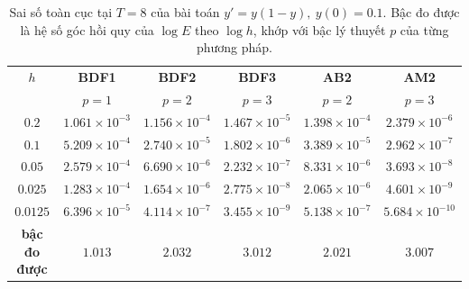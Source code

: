 \begin{table}[H]
\centering
\caption{Sai số toàn cục tại $T=8$ của bài toán $y'=y(1-y),\ y(0)=0.1$. Bậc đo được là hệ số góc hồi quy của $\log E$ theo $\log h$, khớp với bậc lý thuyết $p$ của từng phương pháp.}
\label{tab:convergence}
\renewcommand{\arraystretch}{1.2}
\begin{tabular}{cccccc}
\toprule
$h$ & \textbf{BDF1} & \textbf{BDF2} & \textbf{BDF3} & \textbf{AB2} & \textbf{AM2}\\
 & $p=1$ & $p=2$ & $p=3$ & $p=2$ & $p=3$\\
\midrule
$0.2$ & $1.061\times 10^{-3}$ & $1.156\times 10^{-4}$ & $1.467\times 10^{-5}$ & $1.398\times 10^{-4}$ & $2.379\times 10^{-6}$\\
$0.1$ & $5.209\times 10^{-4}$ & $2.740\times 10^{-5}$ & $1.802\times 10^{-6}$ & $3.389\times 10^{-5}$ & $2.962\times 10^{-7}$\\
$0.05$ & $2.579\times 10^{-4}$ & $6.690\times 10^{-6}$ & $2.232\times 10^{-7}$ & $8.331\times 10^{-6}$ & $3.693\times 10^{-8}$\\
$0.025$ & $1.283\times 10^{-4}$ & $1.654\times 10^{-6}$ & $2.775\times 10^{-8}$ & $2.065\times 10^{-6}$ & $4.601\times 10^{-9}$\\
$0.0125$ & $6.396\times 10^{-5}$ & $4.114\times 10^{-7}$ & $3.455\times 10^{-9}$ & $5.138\times 10^{-7}$ & $5.684\times 10^{-10}$\\
\midrule
\textbf{bậc đo được} & $1.013$ & $2.032$ & $3.012$ & $2.021$ & $3.007$\\
\bottomrule
\end{tabular}
\end{table}

